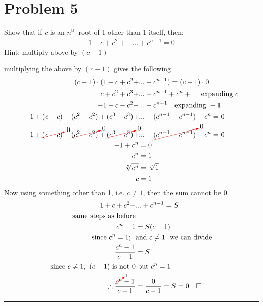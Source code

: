 \documentclass{article}
\newcommand{\canceling}[2]{\textcolor{red}{\cancelto{\textcolor{black}{#1}}{\textcolor{black}{#2}}}}
\begin{document}
\newpage

\section*{Problem 5}
Show that if $c$ is an $n^{\text{th}}$ root of 1 other than 1 itself, then:
\begin{align*}
  1 + c + c^2 + &... + c^{n-1} = 0
\end{align*}
Hint: multiply above by $(c-1)$

multiplying the above by $(c-1)$ gives the following
\begin{align*}
  (c-1)\cdot(1 + c + c^2 + &... + c^{n-1}) = (c-1)\cdot 0\\
  c + c^2 + c^3 + &... + c^{n-1} + c^n +\ \ \ \text{ expanding }c \\
  -1 -c -c^2 -&... -c^{n-1} \ \ \ \text{expanding }-1\\
  -1 + (c-c) + (c^2-c^2) + (c^3-c^3) +&... + (c^{n-1}-c^{n-1}) + c^n = 0\\
  -1 + \canceling{0}{(c-c)} + \canceling{0}{(c^2-c^2)} + \canceling{0}{(c^3-c^3)} +&... + \canceling{0}{(c^{n-1}-c^{n-1})} + c^n = 0\\
  -1 + c^n &= 0\\
  c^n &= 1\\
  \sqrt[n]{c^n} &= \sqrt[n]{1}\\
  c &= 1
\end{align*}
Now using something other than 1, i.e. $c\neq 1$, then the sum cannot be 0.
\begin{align*}
  1 + c + c^2 + &... + c^{n-1} = S\\
  \text{same steps as before}&\\
  c^n -1 &= S(c-1)\\
  \text{since }c^n = 1;\ \ &\text{and }c \neq 1\ \ \text{we can divide}\\
  \frac{c^n -1}{c-1} &= S\\
  \text{since }c \neq 1;\ (c-1)\ \text{is not}\ 0 & \text{ but }c^n = 1\\
  \therefore \frac{\canceling{1}{c^n}-1}{c-1} &= \frac{0}{c-1} = S = 0 \quad \square
\end{align*}

 \vspace{1cm}
 \hrule
\newpage
\end{document}
